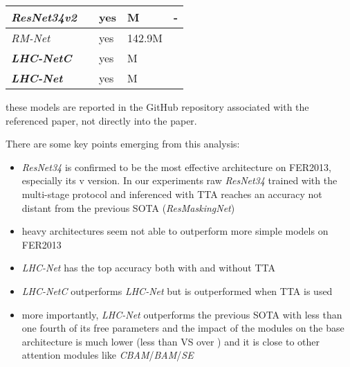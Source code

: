 \documentclass[fleqn,10pt]{SelfArx}
\begin{document}
\begin{center}
\begin{tabular}{||p{2.2cm} | p{1.3cm} | p{0.7cm} | p{1.2cm} | p{0.8cm}||}
\hline
\hline
\textit{ResNet34v2}       & \hspace{0.15cm}               & \hspace{0.12cm}yes   & \hspace{0.12cm}M & \hspace{0.4cm}-\\
\hline
\hline
\textit{RM-Net} \cite{resmaskingnet}      & \hspace{0.15cm}              & \hspace{0.12cm}yes & \hspace{0.05cm}142.9M &  \\
\hline
\hline
\textbf{\textit{LHC-NetC}}                    & \hspace{0.15cm} & \hspace{0.12cm}yes & \hspace{0.12cm}M & \\
\hline
\hline
\textbf{\textit{LHC-Net}}                      & \hspace{0.15cm} & \hspace{0.12cm}yes & \hspace{0.12cm}M & \\
\hline
\end{tabular}
\end{center}
 these models are reported in the GitHub repository associated with the referenced paper, not directly into the paper.
\

There are some key points emerging from this analysis:
\begin{itemize}
\item \textit{ResNet34} is confirmed to be the most effective architecture on FER2013, especially its v version. In our experiments raw \textit{ResNet34} trained with the multi-stage protocol and inferenced with TTA reaches an accuracy not distant from the previous SOTA (\textit{ResMaskingNet})
\item heavy architectures seem not able to outperform more simple models on FER2013
\item \textit{LHC-Net} has the top accuracy both with and without TTA
\item \textit{LHC-NetC} outperforms \textit{LHC-Net} but is outperformed when TTA is used
\item more importantly, \textit{LHC-Net} outperforms the previous SOTA with less than one fourth of its free parameters and the impact of the  modules on the base architecture is much lower (less than  VS over ) and it is close to other attention modules like \textit{CBAM}/\textit{BAM}/\textit{SE}
\end{itemize}
\end{document}
